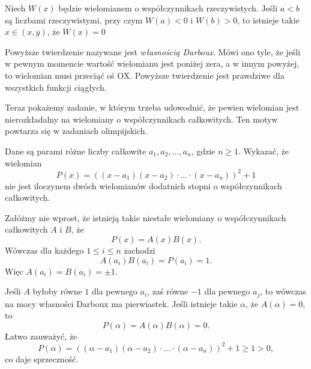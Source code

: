 \noindent
Niech $W(x)$ będzie wielomianem o współczynnikach rzeczywistych. Jeśli $a < b$ są liczbami rzeczywistymi, przy czym $W(a) < 0$ i $W(b) > 0$, to istnieje takie $x \in (x, y)$, że $W(x) = 0$
\begin{center}
	
\end{center}

\vspace{20px}
\noindent
Powyższe twierdzenie nazywane jest \textit{własnością Darboux}. Mówi ono tyle, że jeśli w pewnym momencie wartość wielomianu jest poniżej zera, a w innym powyżej, to wielomian musi przeciąć oś OX. Powyższe twierdzenie jest prawdziwe dla wszystkich funkcji ciągłych.
\vspace{5px}


\noindent
Teraz pokażemy zadanie, w którym trzeba udowodnić, że pewien wielomian jest nierozkładalny na wielomiany o współczynnikach całkowitych. Ten motyw powtarza się w zadaniach olimpijskich.
\vspace{5px}


\noindent
Dane są parami różne liczby całkowite $a_1, a_2, ..., a_n$, gdzie $n \geqslant 1$. Wykazać, że wielomian 
\[
	P(x)=((x − a_1)(x − a_2)\cdot ...\cdot (x − a_n))^2 + 1
\]
nie jest iloczynem dwóch wielomianów dodatnich stopni o współczynnikach całkowitych.
\vspace{5px}


\noindent
Załóżmy nie wprost, że istnieją takie niestałe wielomiany o współczynnikach całkowitych $A$ i $B$, że
\[
	P(x) = A(x)B(x).
\]
Wówczas dla każdego $1 \leqslant i \leqslant n$ zachodzi
\[
	A(a_i)B(a_i) = P(a_i) = 1.
\]
Więc $A(a_i) = B(a_i) = \pm 1$. 

\vspace{10px}
\noindent
Jeśli $A$ byłoby równe $1$ dla pewnego $a_i$, zaś równe $-1$ dla pewnego $a_j$, to wówczas na mocy własności Darboux ma pierwiastek. Jeśli istnieje takie $\alpha$, że $A(\alpha) = 0$, to
\[
	P(\alpha) = A(\alpha)B(\alpha) = 0.
\]
Łatwo zauważyć, że
\[
	P(\alpha) = ((\alpha − a_1)(\alpha − a_2)\cdot ...\cdot (\alpha − a_n))^2 + 1 \geqslant 1 > 0,
\]
co daje sprzeczność.

